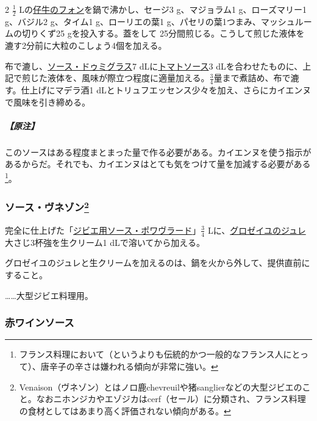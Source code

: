\begin{recette}
2 \(\frac{1}{2}\)
Lの\protect\hyperlink{jus-de-veau-brun}{仔牛のフォン}を鍋で沸かし、セージ3
g、マジョラム1 g、ローズマリー1 g、バジル2 g、タイム1 g、ローリエの葉1
g、パセリの葉1つまみ、マッシュルームの切りくず25 gを投入する。蓋をして
25分間煎じる。こうして煎じた液体を漉す2分前に大粒のこしょう4個を加える。

布で漉し、\protect\hyperlink{sauce-demi-glace}{ソース・ドゥミグラス}7
dLに\protect\hyperlink{sauce-tomate}{トマトソース}3
dLを合わせたものに、上記で煎じた液体を、風味が際立つ程度に適量加える。\(\frac{3}{4}\)量まで煮詰め、布で漉す。仕上げにマデラ酒1
dLとトリュフエッセンス少々を加え、さらにカイエンヌで風味を引き締める。

\hypertarget{nota-sauce-tortue}{%
\subparagraph{【原注】}\label{nota-sauce-tortue}}

このソースはある程度まとまった量で作る必要がある。カイエンヌを使う指示があるからだ。それでも、カイエンヌはとても気をつけて量を加減する必要がある\footnote{フランス料理において（というよりも伝統的かつ一般的なフランス人にとって）、唐辛子の辛さは嫌われる傾向が非常に強い。}。

\hypertarget{sauce-venaison}{%
\subsubsection[ソース・ヴネゾン]{\texorpdfstring{ソース・ヴネゾン\footnote{Venaison（ヴネゾン）とはノロ鹿chevreuilや猪sanglierなどの大型ジビエのこと。なおニホンジカやエゾジカはcerf（セール）に分類され、フランス料理の食材としてはあまり高く評価されない傾向がある。}}{ソース・ヴネゾン}}\label{sauce-venaison}}



完全に仕上げた「\protect\hyperlink{sauce-poivrade-pour-gibier}{ジビエ用ソース・ポワヴラード}」\(\frac{3}{4}\)
Lに、\protect\hyperlink{gelee-de-groseilles-a}{グロゼイユのジュレ}大さじ3杯強を生クリーム1
dLで溶いてから加える。

グロゼイユのジュレと生クリームを加えるのは、鍋を火から外して、提供直前にすること。

\ldots{}\ldots{}大型ジビエ料理用。

\hypertarget{sauce-vin-rouge}{%
\subsubsection{赤ワインソース}\label{sauce-vin-rouge}}


\end{recette}
